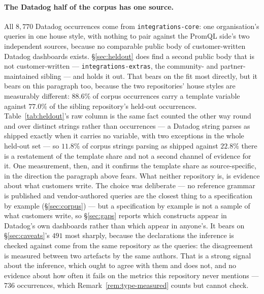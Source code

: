 \paragraph{The Datadog half of the corpus has one source.}
All $8{,}770$ Datadog occurrences come from \texttt{integrations-core}: one organisation's
queries in one house style, with nothing to pair against the PromQL side's two independent
sources, because no comparable public body of customer-written Datadog dashboards exists.
\S\ref{sec:heldout} does find a second public body that is not customer-written ---
\texttt{integrations-extras}, the community- and partner-maintained sibling --- and holds
it out. That bears on the fit most directly, but it bears on this paragraph too, because
the two repositories' house styles are measurably different: $88.6\%$ of corpus
occurrences carry a template variable against $77.0\%$ of the sibling
repository's held-out occurrences.
Table~\ref{tab:heldout}'s raw column is the same fact counted the other way round and
over distinct strings rather than occurrences --- a Datadog string parses as shipped
exactly when it carries no variable, with two exceptions in the whole held-out set ---
so $11.8\%$ of corpus strings parsing as shipped against $22.8\%$ there is a restatement
of the template share and not a second channel of evidence for it. One measurement,
then, and it confirms the template share as source-specific, in the direction the
paragraph above fears. What neither repository is,
is evidence about what customers write.
The choice was deliberate --- no reference grammar is published and vendor-authored queries
are the closest thing to a specification by example (\S\ref{sec:corpus}) --- but a
specification by example is not a sample of what customers write, so \S\ref{sec:gaps}
reports which constructs appear in Datadog's own dashboards rather than which appear in
anyone's. It bears on \S\ref{sec:caveats}'s $491$ most sharply, because the declarations
the inference is checked against come from the same repository as the queries: the
disagreement is measured between two artefacts by the same authors. That is a strong
signal about the inference, which ought to agree with them and does not, and no evidence
about how often it fails on the metrics this repository never mentions --- $736$
occurrences, which Remark~\ref{rem:type-measured} counts but cannot check.

